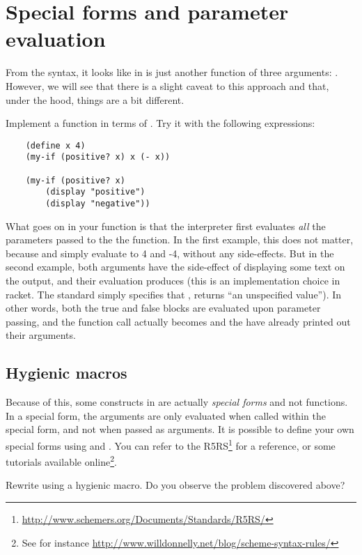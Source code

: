 \documentclass{../../../tp}
\begin{document}
\section{Special forms and parameter evaluation}

From the syntax, it looks like  in \scheme is just another function of three arguments: . However, we will see that there is a slight caveat to this approach and that, under the hood, things are a bit different.

\begin{instruction}
	Implement a  function in terms of . Try it with the following expressions:
	
	\begin{verbatim}
	(define x 4)
	(my-if (positive? x) x (- x))
	
	(my-if (positive? x) 
		(display "positive") 
		(display "negative"))
	\end{verbatim}
\end{instruction}

What goes on in your  function is that the interpreter first evaluates \emph{all} the parameters passed to the the function. In the first example, this does not matter, because  and  simply evaluate to 4 and -4, without any side-effects. But in the second example, both arguments have the side-effect of displaying some text on the output, and their evaluation produces  (this is an implementation choice in racket. The standard simply specifies that , returns ``an unspecified value''). In other words, both the true and false blocks are evaluated upon parameter passing, and the function call actually becomes  and the  have already printed out their arguments.  

\subsection{Hygienic macros}

Because of this, some constructs in \scheme are actually \emph{special forms} and not functions. In a special form, the arguments are only evaluated when called within the special form, and not when passed as arguments. It is possible to define your own special forms using  and . You can refer to the R5RS\footnote{\url{http://www.schemers.org/Documents/Standards/R5RS/}} for a reference, or some tutorials available online\footnote{See for instance \url{http://www.willdonnelly.net/blog/scheme-syntax-rules/}}.

\begin{instruction}
Rewrite  using a hygienic macro. Do you observe the problem discovered above? 	
\end{instruction}
\end{document}
